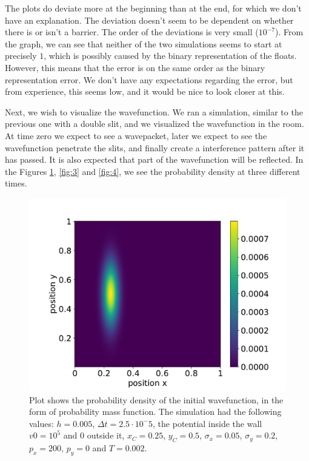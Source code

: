 \documentclass[english,notitlepage,reprint,nofootinbib]{revtex4-1}  %
\begin{document}
The plots do deviate more at the beginning than at the end, for which we don't have an explanation. The deviation doesn't seem to be dependent on whether there is or isn't a barrier. The order of the deviations is very small ($10^{-7}$). From the graph, we can see that neither of the two simulations seems to start at precisely $1$, which is possibly caused by the binary representation of the floats. However, this means that the error is on the same order as the binary representation error. We don't have any expectations regarding the error, but from experience, this seems low, and it would be nice to look closer at this.

Next, we wish to visualize the wavefunction. We ran a simulation, similar to the previous one with a double slit, and we visualized the wavefunction in the room. At time zero we expect to see a wavepacket, later we expect to see the wavefunction penetrate the slits, and finally create a interference pattern after it has passed. It is also expected that part of the wavefunction will be reflected. In the Figures \ref{fig:2}, \ref{fig:3} and \ref{fig:4}, we see the probability density at three different times.

\FloatBarrier
\begin{figure}[h!]
    \centering %
    \includegraphics[scale=0.37]{figures/contur_P_2_t0.pdf} %
    \caption{Plot shows the probability density of the initial wavefunction, in the form of probability mass function. The simulation had the following values: $h=0.005$, $\Delta t = 2.5\cdot 10^-5$, the potential inside the wall $v0 = 10^5$ and $0$ outside it, $x_C = 0.25$, $y_C = 0.5$, $\sigma _x = 0.05$, $\sigma _y = 0.2$, $p_x = 200$, $p_y = 0$ and $T = 0.002$.}
    \label{fig:2}
\end{figure}
\FloatBarrier
\end{document}
